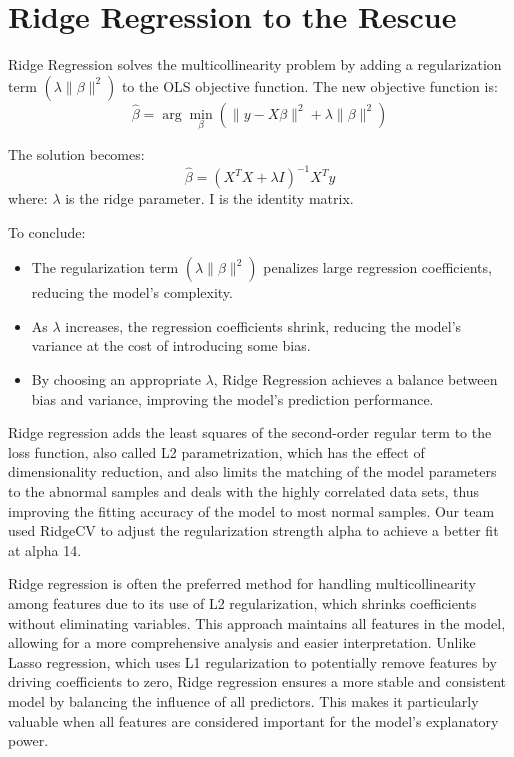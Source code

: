 \documentclass{article}
\begin{document}
\section{Ridge Regression to the Rescue}

Ridge Regression solves the multicollinearity problem by 
adding a regularization term $(\lambda\|\beta\|^2)$ to the 
OLS objective function. The new objective function is:
$$ \hat{\beta} = \arg\min_{\beta} (\|y - X\beta\|^2+
\lambda\|\beta\|^2) $$

\smallskip
\noindent
The solution becomes:
$$ \hat{\beta} = (X^T X + \lambda I)^{-1} X^T y $$
where:
$\lambda$ is the ridge parameter.
I is the identity matrix.

\smallskip
\noindent
To conclude:
\smallskip
\begin{itemize}
	\item The regularization term $(\lambda\|\beta\|^2)$ 
    penalizes large regression coefficients, reducing the 
    model's complexity.
	\item As $\lambda$ increases, the regression coefficients 
    shrink, reducing the model's variance at the cost of 
    introducing some bias.
    \item By choosing an appropriate $\lambda$, Ridge 
    Regression achieves a balance between bias and variance, 
    improving the model's prediction performance.
\end{itemize}

\smallskip
\noindent
Ridge regression adds the least squares of the second-order 
regular term to the loss
function, also called L2 parametrization, which has the 
effect of dimensionality reduction, and also limits the 
matching of the model parameters to the abnormal samples
and deals with the highly correlated data sets, thus 
improving the fitting accuracy of
the model to most normal samples. Our team used RidgeCV to 
adjust the regularization strength alpha to achieve a better 
fit at alpha 14.

\smallskip
\noindent
Ridge regression is often the preferred method for handling 
multicollinearity among features due to its use of L2 
regularization, which shrinks coefficients without 
eliminating variables. This approach maintains all features 
in the model, allowing for a more comprehensive analysis and 
easier interpretation. Unlike Lasso regression, which uses 
L1 regularization to potentially remove features by driving 
coefficients to zero, Ridge regression ensures a more stable 
and consistent model by balancing the influence of all 
predictors. This makes it particularly valuable when all 
features are considered important for the model's 
explanatory power.
\end{document}

